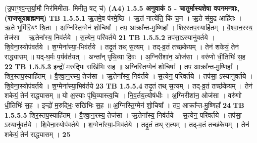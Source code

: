 \documentclass[17pt]{extarticle}
\begin{document}
                  \newline
                                    (उ॒पाꣳ॒॒श्व॒न्त॒र्या॒मौ निर॑मिमीता- मिमीत॒ षट् च॑) \textbf{(A4)} \newline \newline
                \textbf{ 1.5.5     अनुवाकं   5 - चातुर्मास्यशेषा वपनमन्त्राः, (राजसूयब्राह्मणम्)} \newline
                                \textbf{ TB 1.5.5.1} \newline
                  ऋ॒तमे॒व प॑रमे॒ष्ठि । ऋ॒तं नात्ये॑ति॒ किं च॒न । ऋ॒ते स॑मु॒द्र आहि॑तः । ऋ॒ते भूमि॑रि॒यꣳ श्रि॒ता । अ॒ग्निस्ति॒ग्मेन॑ शो॒चिषा᳚ । तप॒ आक्रा᳚न्त-मु॒ष्णिहा᳚ । शिर॒स्तप॒स्याहि॑तम् । वै॒श्वा॒न॒रस्य॒ तेज॑सा । ऋ॒तेना᳚स्य॒ निव॑र्तये । स॒त्येन॒ परि॑वर्तये \textbf{ 21} \newline
                  \newline
                                \textbf{ TB 1.5.5.2} \newline
                  तप॑सा॒ऽस्यानु॑वर्तये । शि॒वेना॒स्योप॑वर्तये । श॒ग्मेना᳚स्या॒-भिव॑र्तये । तदृ॒तं तथ् स॒त्यम् । तद्-व्र॒तं तच्छ॑केयम् । तेन॑ शकेयं॒ तेन॑ राद्ध्यासम् ॥ यद्-घ॒र्मः प॒र्यव॑र्तयत् । अन्ता᳚न् पृथि॒व्या दि॒वः । अ॒ग्निरीशा॑न॒ ओज॑सा । वरु॑णो धी॒तिभिः॑ स॒ह \textbf{ 22} \newline
                  \newline
                                \textbf{ TB 1.5.5.3} \newline
                  इन्द्रो॑ म॒रुद्भिः॒ सखि॑भिः स॒ह ॥ अ॒ग्निस्ति॒ग्मेन॑ शो॒चिषा᳚ । तप॒ आक्रा᳚न्त-मु॒ष्णिहा᳚ । शिर॒स्तप॒स्याहि॑तम् । वै॒श्वा॒न॒रस्य॒ तेज॑सा । ऋ॒तेना᳚स्य॒ निव॑र्तये । स॒त्येन॒ परि॑वर्तये । तप॑सा॒ ऽस्यानु॑वर्तये । शि॒वेना॒स्योप॑वर्तये । श॒ग्मेना᳚स्या॒भिव॑र्तये \textbf{ 23} \newline
                  \newline
                                \textbf{ TB 1.5.5.4} \newline
                  तदृ॒तं तथ् स॒त्यम् । तद्-व्र॒तं तच्छ॑केयम् । तेन॑ शकेयं॒ तेन॑ राद्ध्यासम् ॥ यो अ॒स्याः पृ॑थि॒व्यास्त्व॒चि । नि॒व॒र्तय॒त्योष॑धीः । अ॒ग्निरीशा॑न॒ ओज॑सा । वरु॑णो धी॒तिभिः॑ स॒ह । इन्द्रो॑ म॒रुद्भिः॒ सखि॑भिः स॒ह ॥ अ॒ग्निस्ति॒ग्मेन॑ शो॒चिषा᳚ । तप॒ आक्रा᳚न्त-मु॒ष्णिहा᳚ \textbf{ 24} \newline
                  \newline
                                \textbf{ TB 1.5.5.5} \newline
                  शिर॒स्तप॒स्याहि॑तम् । वै॒श्वा॒न॒रस्य॒ तेज॑सा । ऋ॒तेना᳚स्य॒ निव॑र्तये । स॒त्येन॒ परि॑वर्तये । तप॑सा॒ ऽस्यानु॑वर्तये । शि॒वेना॒स्योप॑वर्तये । श॒ग्मेना᳚स्या॒-भिव॑र्तये । तदृ॒तं तथ् स॒त्यम् । तद्-व॒तं तच्छ॑केयम् । तेन॑ शकेयं॒ तेन॑ राद्ध्यासम् । \textbf{ 25} \newline
\end{document}
